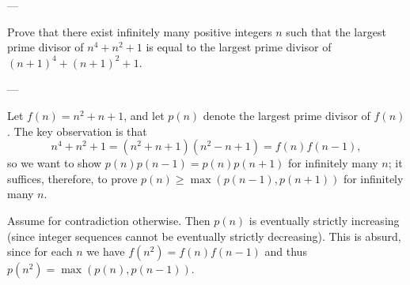 
---

Prove that there exist infinitely many positive integers $n$ such that the largest prime divisor of $n^4+n^2+1$ is equal to the largest prime divisor of $(n+1)^4+(n+1)^2+1$.

---

Let $f(n)=n^2+n+1$, and let $p(n)$ denote the largest prime divisor of $f(n)$. The key observation is that \[n^4+n^2+1=\left(n^2+n+1\right)\left(n^2-n+1\right)=f(n)f(n-1),\]
so we want to show $p(n)p(n-1)=p(n)p(n+1)$ for infinitely many $n$; it suffices, therefore, to prove $p(n)\ge\max(p(n-1),p(n+1))$ for infinitely many $n$.

Assume for contradiction otherwise. Then $p(n)$ is eventually strictly increasing (since integer sequences cannot be eventually strictly decreasing). This is absurd, since for each $n$ we have $f(n^2)=f(n)f(n-1)$ and thus $p(n^2)=\max(p(n),p(n-1))$.


